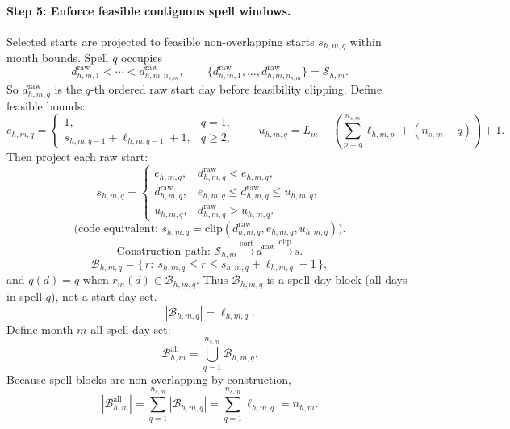 \documentclass[11pt]{article}
\begin{document}
\paragraph{Step 5: Enforce feasible contiguous spell windows.}
Selected starts are projected to feasible non-overlapping starts \(s_{h,m,q}\) within month bounds. Spell \(q\) occupies
\[
d_{h,m,1}^{\mathrm{raw}}<\cdots<d_{h,m,n_{s,m}}^{\mathrm{raw}},
\qquad
\{d_{h,m,1}^{\mathrm{raw}},\dots,d_{h,m,n_{s,m}}^{\mathrm{raw}}\}=\mathcal{S}_{h,m}.
\]
So \(d_{h,m,q}^{\mathrm{raw}}\) is the \(q\)-th ordered raw start day before feasibility clipping.
Define feasible bounds:
\[
e_{h,m,q}=
\begin{cases}
1, & q=1,\\
s_{h,m,q-1}+\ell_{h,m,q-1}+1, & q\ge 2,
\end{cases}
\qquad
u_{h,m,q}=L_m-\left(\sum_{p=q}^{n_{s,m}}\ell_{h,m,p}+(n_{s,m}-q)\right)+1.
\]
Then project each raw start:
\[
s_{h,m,q}=
\begin{cases}
e_{h,m,q}, & d_{h,m,q}^{\mathrm{raw}}<e_{h,m,q},\\
d_{h,m,q}^{\mathrm{raw}}, & e_{h,m,q}\le d_{h,m,q}^{\mathrm{raw}}\le u_{h,m,q},\\
u_{h,m,q}, & d_{h,m,q}^{\mathrm{raw}}>u_{h,m,q}.
\end{cases}
\]
\[
\text{(code equivalent: }s_{h,m,q}=\mathrm{clip}(d_{h,m,q}^{\mathrm{raw}},e_{h,m,q},u_{h,m,q})\text{).}
\]
\[
\text{Construction path: }\mathcal{S}_{h,m}\xrightarrow{\text{sort}}d^{\mathrm{raw}}\xrightarrow{\text{clip}}s.
\]
\begin{equation}
\label{eq:heatwave_spell_block}
\mathcal{B}_{h,m,q}=\{\,r:\ s_{h,m,q}\le r\le s_{h,m,q}+\ell_{h,m,q}-1\,\},
\end{equation}
and \(q(d)=q\) when \(r_m(d)\in\mathcal{B}_{h,m,q}\).
Thus \(\mathcal{B}_{h,m,q}\) is a spell-day block (all days in spell \(q\)), not a start-day set.
\begin{equation}
\label{eq:heatwave_spell_block_size}
\left|\mathcal{B}_{h,m,q}\right|=\ell_{h,m,q}.
\end{equation}
Define month-\(m\) all-spell day set:
\begin{equation}
\label{eq:heatwave_spell_block_union}
\mathcal{B}_{h,m}^{\mathrm{all}}=\bigcup_{q=1}^{n_{s,m}}\mathcal{B}_{h,m,q}.
\end{equation}
Because spell blocks are non-overlapping by construction,
\begin{equation}
\label{eq:heatwave_spell_block_union_size}
\left|\mathcal{B}_{h,m}^{\mathrm{all}}\right|
=\sum_{q=1}^{n_{s,m}}\left|\mathcal{B}_{h,m,q}\right|
=\sum_{q=1}^{n_{s,m}}\ell_{h,m,q}
=n_{h,m}.
\end{equation}
\end{document}
